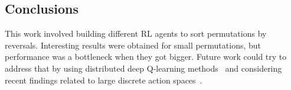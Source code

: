 \documentclass[11pt,twoside]{article}
\begin{document}
\subsection{Conclusions}

This work involved building different RL agents to sort permutations by reversals. Interesting results were obtained for small permutations, but performance was a bottleneck when they got bigger. Future work could try to address that by using distributed deep Q-learning methods~\cite{dist_dqnn1, dist_dqnn2} and considering recent findings related to large discrete action spaces~\cite{large_space}.



\end{document}
